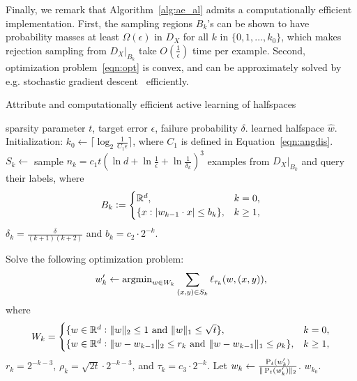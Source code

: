 Finally, we remark that Algorithm~\ref{alg:ae_al} admits a computationally efficient implementation. First, the sampling regions $B_k$'s can be shown to have probability masses at least $\Omega(\epsilon)$ in $D_X$ for all $k$ in $\{0,1,\ldots,k_0\}$, which makes rejection sampling from $D_X|_{B_k}$ take $O(\frac 1 \epsilon)$ time per example.
Second, optimization problem~\eqref{eqn:opt} is convex, and can be approximately solved by e.g. stochastic gradient descent~\citep[See e.g.][Theorem 2]{SZ13} efficiently.

\begin{algorithm}[t]
  \caption{Attribute and computationally efficient active learning of halfspaces}
\begin{algorithmic}[1]
  \REQUIRE sparsity parameter $t$, target error $\epsilon$, failure probability $\delta$.
  \ENSURE  learned halfspace $\hat{w}$.
  \STATE Initialization: $k_0 \gets \lceil \log_2 \frac {1} {C_1 \epsilon} \rceil$, where $C_1$ is defined in Equation~\eqref{eqn:angdis}.
  \STATE $S_k \gets $ sample $n_k = c_1 t (\ln d + \ln \frac{1}{\epsilon} + \ln\frac1{\delta_k})^3$ examples from $D_X|_{B_k}$ and query their labels, where
  \[ B_k := \begin{cases} \mathbb{R}^d, & k = 0, \\ \{x: |w_{k-1} \cdot x| \leq b_k \}, & k \geq 1, \end{cases}\]
	$\delta_k = \frac{\delta}{(k+1)(k+2)}$ and $b_k = c_2 \cdot 2^{-k}$.

  \STATE Solve the following optimization problem:
  \begin{equation}
    w_k' \gets \operatorname{argmin}_{w \in W_k} \sum_{(x,y) \in S_k} \ell_{\tau_k}(w, (x, y)),
    \label{eqn:opt}
  \end{equation}
  where
  \[ W_k = \begin{cases} \{ w \in \mathbb{R}^d: \| w \|_2 \leq 1 \text{ and } \| w \|_1 \leq \sqrt{t} \}, & k = 0, \\ \{ w \in \mathbb{R}^d: \| w - w_{k-1} \|_2 \leq r_k \text{ and } \| w - w_{k-1} \|_1 \leq \rho_k \}, & k \geq 1, \end{cases}
  \]
  $r_k = 2^{-k-3}$, $\rho_k = \sqrt{2t} \cdot 2^{-k-3}$, and $\tau_k = c_3 \cdot 2^{-k}$.
	\label{line:hlm}
  \STATE Let $w_k \gets \frac{\operatorname{P}_t(w_k')}{\| \operatorname{P}_t(w_k') \|_2}$.
	\label{line:ht}
  \ENDFOR
  \RETURN $w_{k_0}$.
\end{algorithmic}
\label{alg:ae_al}
\end{algorithm}
